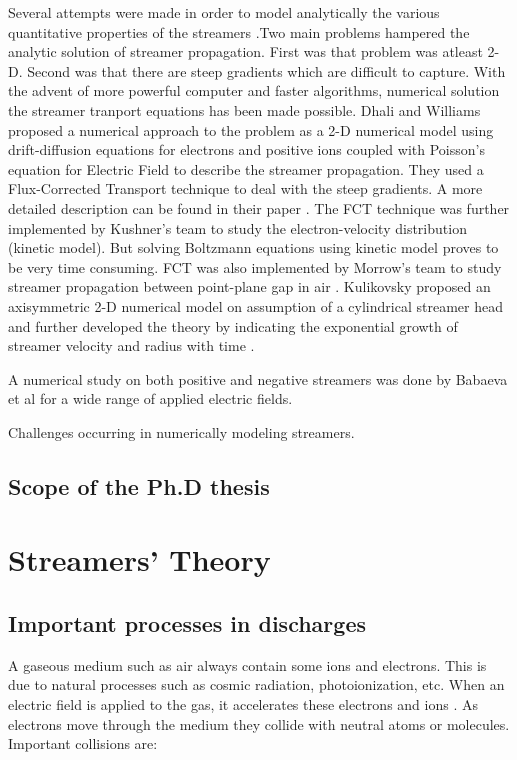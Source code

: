 Several attempts were made in order to model analytically the various quantitative properties of the streamers \cite{Davies, Davies, Evans, 1971}.Two main problems hampered the analytic solution of streamer propagation. First was that problem was atleast 2-D. Second was that there are steep gradients which are difficult to capture. With the advent of more powerful computer and faster algorithms, numerical solution the streamer tranport equations has been made possible. Dhali and Williams proposed a numerical approach to the problem as a 2-D numerical model using drift-diffusion equations for electrons and positive ions coupled with Poisson's equation for Electric Field to describe the streamer propagation. They used a Flux-Corrected Transport technique to deal with the steep gradients. A more detailed description can be found in their paper \cite{Dhalli 1987}. The FCT technique was further implemented by Kushner's team \cite{Kushner et al 1989} to study the electron-velocity distribution (kinetic model). But solving Boltzmann equations using kinetic model proves to be very time consuming. FCT was also implemented by Morrow's team to study streamer propagation between point-plane gap in air \cite{Morrow et al, 1997}. Kulikovsky proposed an axisymmetric 2-D numerical model on assumption of a cylindrical streamer head \cite{Kulikovsky 1994} and further developed the theory by indicating the exponential growth of streamer velocity and radius with time \cite{KuliKovsky 1997}. 



A numerical study on both positive and negative streamers was done by Babaeva et al \cite{Babaeva et al 1997} for a wide range of applied electric fields.     




Challenges occurring in numerically modeling streamers.


\section{Scope of the Ph.D thesis}




\chapter{Streamers' Theory}

\section{Important processes in discharges}
A gaseous medium such as air always contain some ions and electrons. This is due to natural processes such as cosmic radiation, photoionization, etc. When an electric field is applied to the gas, it accelerates these electrons and ions . As electrons move through the medium they collide with neutral atoms or molecules. Important collisions are:

